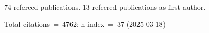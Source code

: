 74 refereed publications. 13 refeered publications as first author.

Total citations~=~4762; h-index~=~37 (2025-03-18)